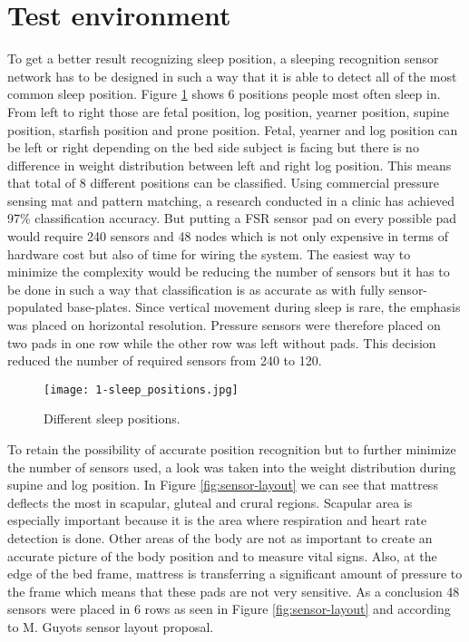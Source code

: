 \section{Test environment}
\label{ssec:test_environment}

To get a better result recognizing sleep position, a sleeping recognition sensor network has to be designed in such a way that it is able to detect all of the most common sleep position. Figure \ref{fig:sleep_positions} shows 6 positions people most often sleep in. From left to right those are fetal position, log position, yearner position, supine position, starfish position and prone position. Fetal, yearner and log position can be left or right depending on the bed side subject is facing but there is no difference in weight distribution between left and right log position. This means that total of 8 different positions can be classified. Using commercial pressure sensing mat and pattern matching, a research conducted in a clinic has achieved 97\% classification accuracy\cite{postures}. But putting a \ac{FSR} sensor pad on every possible pad would require 240 sensors and 48 nodes which is not only expensive in terms of hardware cost but also of time for wiring the system. The easiest way to minimize the complexity would be reducing the number of sensors but it has to be done in such a way that classification is as accurate as with fully sensor-populated base-plates. Since vertical movement during sleep is rare, the emphasis was placed on horizontal resolution. Pressure sensors were therefore placed on two pads in one row while the other row was left without pads. This decision reduced the number of required sensors from 240 to 120.

\begin{figure}[h]
  \begin{center}
    \texttt{[image: 1-sleep\_positions.jpg]}
  \end{center}
  \caption{Different sleep positions.}
  \label{fig:sleep_positions}
\end{figure}

To retain the possibility of accurate position recognition but to further minimize the number of sensors used, a look was taken into the weight distribution during supine and log position. In Figure \ref{fig:sensor-layout} we can see that mattress deflects the most in scapular, gluteal and crural regions. Scapular area is especially important because it is the area where respiration and heart rate detection is done. Other areas of the body are not as important to create an accurate picture of the body position and to measure vital signs. Also, at the edge of the bed frame, mattress is transferring a significant amount of pressure to the frame which means that these pads are not very sensitive. As a conclusion 48 sensors were placed in 6 rows as seen in Figure \ref{fig:sensor-layout} and according to M. Guyots\cite{Guyot} sensor layout proposal.

